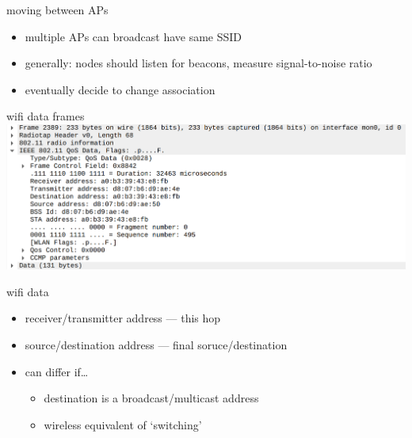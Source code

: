 \begin{frame}{moving between APs}
    \begin{itemize}
    \item multiple APs can broadcast have same SSID
    \item generally: nodes should listen for beacons, measure signal-to-noise ratio
    \vspace{.5cm}
    \item eventually decide to change association
    \end{itemize}
\end{frame}


\begin{frame}{wifi data frames}
\includegraphics[height=0.85\textheight]{../multiaccess/wifi-data-1.png}
\end{frame}

\begin{frame}{wifi data}
    \begin{itemize}
    \item receiver/transmitter address --- this hop
    \item source/destination address --- final soruce/destination
    \vspace{.5cm}
    \item can differ if\ldots
        \begin{itemize}
        \item destination is a broadcast/multicast address
        \item wireless equivalent of `switching'
        \end{itemize}
    \end{itemize}
\end{frame}

